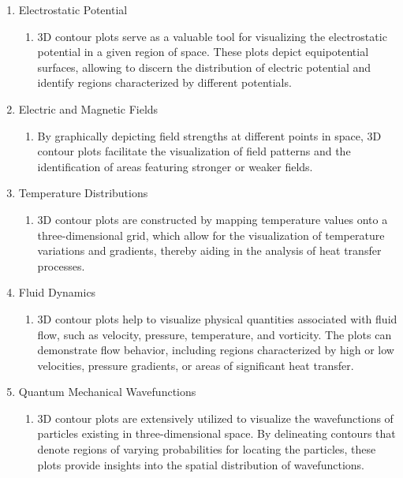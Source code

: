 \documentclass[
11pt, %
a4paper, %
oneside, %
headinclude,footinclude, %
BCOR5mm, %
]{scrartcl}
\begin{document}
\begin{enumerate}
	\item Electrostatic Potential
	\begin{enumerate}
		\item[] 3D contour plots serve as a valuable tool for visualizing the electrostatic potential in a given region of space. These plots depict equipotential surfaces, allowing to discern the distribution of electric potential and identify regions characterized by different potentials.
	\end{enumerate}
	\item Electric and Magnetic Fields
	\begin{enumerate}
		\item[] By graphically depicting field strengths at different points in space, 3D contour plots facilitate the visualization of field patterns and the identification of areas featuring stronger or weaker fields.
	\end{enumerate}
	\item Temperature Distributions
	\begin{enumerate}
		\item[] 3D contour plots are constructed by mapping temperature values onto a three-dimensional grid, which allow for the visualization of temperature variations and gradients, thereby aiding in the analysis of heat transfer processes.
	\end{enumerate}
	\item Fluid Dynamics
	\begin{enumerate}
		\item[] 3D contour plots help to visualize physical quantities associated with fluid flow, such as velocity, pressure, temperature, and vorticity. The plots can demonstrate flow behavior, including regions characterized by high or low velocities, pressure gradients, or areas of significant heat transfer.
	\end{enumerate}
	\item Quantum Mechanical Wavefunctions
	\begin{enumerate}
		\item[] 3D contour plots are extensively utilized to visualize the wavefunctions of particles existing in three-dimensional space. By delineating contours that denote regions of varying probabilities for locating the particles, these plots provide insights into the spatial distribution of wavefunctions.
	\end{enumerate}
\end{enumerate}
\end{document}
